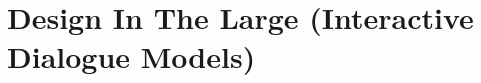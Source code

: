 \documentclass[../DD.tex]{subfiles}
\begin{document}
\chapter{Design In The Large (Interactive Dialogue Models)}
\thispagestyle{fancy}
	
	
	
	
\end{document}
